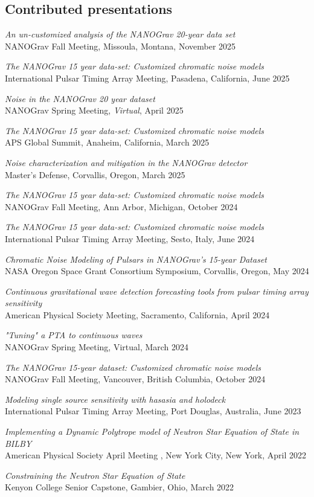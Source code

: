 \documentclass[11pt,letterpaper,sans,unicode]{moderncv}
\newcommand{\talkitem}[3]{\item \textit{#1}\\{#2}, #3} %
\begin{document}
{\subsection{Contributed presentations}
\renewcommand\labelenumi{\bfseries\theenumi .}
\begin{etaremune}[leftmargin=8mm]
\small
\talkitem{An un-customized analysis of the NANOGrav 20-year data set}{NANOGrav Fall Meeting}{Missoula, Montana, November 2025}
\talkitem{The NANOGrav 15 year data-set: Customized chromatic noise models}{International Pulsar Timing Array Meeting}{Pasadena, California, June 2025}
\talkitem{Noise in the NANOGrav 20 year dataset}{NANOGrav Spring Meeting}{\textit{Virtual}, April 2025}
\talkitem{The NANOGrav 15 year data-set: Customized chromatic noise models}{APS Global Summit}{Anaheim, California, March 2025}
\talkitem{Noise characterization and mitigation in the NANOGrav detector}{Master's Defense}{Corvallis, Oregon, March 2025}
\talkitem{The NANOGrav 15 year data-set: Customized chromatic noise models}{NANOGrav Fall Meeting}{Ann Arbor, Michigan, October 2024}
\talkitem{The NANOGrav 15 year data-set: Customized chromatic noise models}{International Pulsar Timing Array Meeting}{Sesto, Italy, June 2024}
\talkitem{Chromatic Noise Modeling of Pulsars in NANOGrav's 15-year Dataset}{NASA Oregon Space Grant Consortium Symposium}{Corvallis, Oregon, May 2024}
\talkitem{Continuous gravitational wave detection forecasting tools from pulsar timing array sensitivity}{American Physical Society Meeting}{Sacramento, California, April 2024}
\talkitem{"Tuning" a PTA to continuous waves}{NANOGrav Spring Meeting}{Virtual, March 2024}
\talkitem{The NANOGrav 15-year dataset: Customized chromatic noise models}{NANOGrav Fall Meeting}{Vancouver, British Columbia, October 2024}
\talkitem{Modeling single source sensitivity with hasasia and holodeck}{International Pulsar Timing Array Meeting}{Port Douglas, Australia, June 2023}
\talkitem{Implementing a Dynamic Polytrope model of Neutron Star Equation of State in BILBY}{American Physical Society April Meeting }{New York City, New York, April 2022}
\talkitem{Constraining the Neutron Star Equation of State}{Kenyon College Senior Capstone}{Gambier, Ohio, March 2022}



\end{etaremune}
}
\end{document}
